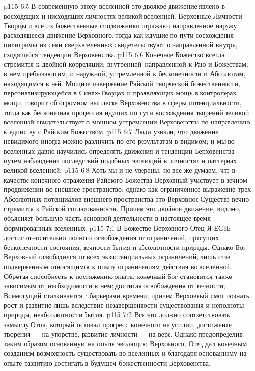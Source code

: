 \vs p115 6:5 В современную эпоху вселенной это двоякое движение явлено в восходящих и нисходящих личностях великой вселенной. Верховные Личности\hyp{}Творцы и все их божественные сподвижники отражают направленное наружу расходящееся движение Верховного, тогда как идущие по пути восхождения пилигримы из семи сверхвселенных свидетельствуют о направленной внутрь, сходящейся тенденции Верховенства.
\vs p115 6:6 Конечное Божество всегда стремится к двойной корреляции: внутренней, направленной к Раю и Божествам, в нем пребывающим, и наружной, устремленной к бесконечности и Абсолютам, находящимся в ней. Мощное извержение Райской творческой божественности, персонализирующейся в Сынах\hyp{}Творцах и проявляющих мощь в контролерах мощи, говорит об огромном выплеске Верховенства в сферы потенциальности, тогда как бесконечная процессия идущих по пути восхождения творений великой вселенной свидетельствует о мощном устремлении Верховенства по направлению к единству с Райским Божеством.
\vs p115 6:7 Люди узнали, что движение невидимого иногда можно различить по его результатам в видимом; и мы во вселенных давно научились определять движения и тенденции Верховенства путем наблюдения последствий подобных эволюций в личностях и паттернах великой вселенной.
\vs p115 6:8 Хоть мы и не уверены, но все же думаем, что в качестве конечного отражения Райского Божества Верховный участвует в вечном продвижении во внешнее пространство; однако как ограниченное выражение трех Абсолютных потенциалов внешнего пространства это Верховное Существо вечно стремится к Райской согласованности. Причем это двойное движение, видимо, объясняет большую часть основной деятельности в настоящее время формированных вселенных.
\vs p115 7:1 В Божестве Верховного Отец\hyp{}Я ЕСТЬ достиг относительно полного освобождения от ограничений, присущих бесконечности состояния, вечности бытия и абсолютности природы. Однако Бог Верховный освободился от всех экзистенциальных ограничений, лишь став подверженным относящимся к опыту ограничениям действия во вселенной. Обретая способность к постижению опыта, конечный Бог становится также зависимым от необходимости в нем; достигая освобождения от вечности, Всемогущий сталкивается с барьерами времени, причем Верховный смог познать рост и развитие лишь вследствие незавершенности существования и неполноты природы, неабсолютности бытия.
\vs p115 7:2 Все это должно соответствовать замыслу Отца, который основал прогресс конечного на усилии, достижение творения --- на упорстве, развитие личности --- на вере. Однако предопределив таким образом основанную на опыте эволюцию Верховного, Отец дал конечным созданиям возможность существовать во вселенных и благодаря основанному на опыте развитию достигать в будущем божественности Верховенства.
